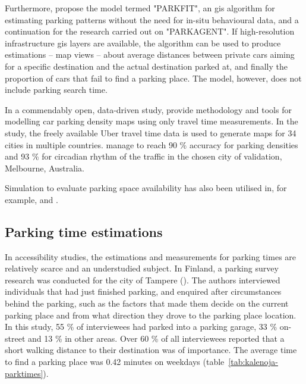 Furthermore,  propose the model termed "PARKFIT", an \acrshort{gis} algorithm for estimating parking patterns without the need for in-situ behavioural data, and a continuation for the research carried out on "PARKAGENT". If high-resolution infrastructure \acrshort{gis} layers are available, the algorithm can be used to produce estimations -- map views -- about average distances between private cars aiming for a specific destination and the actual destination parked at, and finally the proportion of cars that fail to find a parking place. The model, however, does not include parking search time.

In a commendably open, data-driven study,  provide methodology and tools for modelling car parking density maps using only travel time measurements. In the study, the freely available Uber travel time data is used to generate maps for 34 cities in multiple countries. \citeauthor{Aryandoust2019} manage to reach 90 \% accuracy for parking densities and 93 \% for circadian rhythm of the traffic in the chosen city of validation, Melbourne, Australia.

Simulation to evaluate parking space availability has also been utilised in, for example,  and .

\subsection{Parking time estimations}
\justify

In accessibility studies, the estimations and measurements for parking times are relatively scarce and an understudied subject. In Finland, a parking survey research was conducted for the city of Tampere (\cite{Kalenoja2003}). The authors interviewed individuals that had just finished parking, and enquired after circumstances behind the parking, such as the factors that made them decide on the current parking place and from what direction they drove to the parking place location. In this study, 55 \% of interviewees had parked into a parking garage, 33 \% on-street and 13 \% in other areas. Over 60 \% of all interviewees reported that a short walking distance to their destination was of importance. The average time to find a parking place was 0.42 minutes on weekdays (table~\ref{tab:kalenoja-parktimes}).


